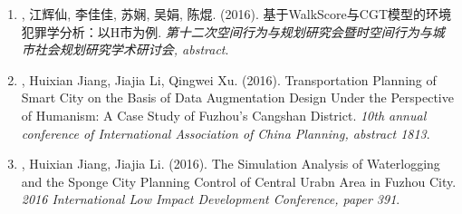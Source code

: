\begin{enumerate}
\item
    {}, 江辉仙, 李佳佳, 苏娴, 吴娟, 陈焜. (2016).
    基于WalkScore与CGT模型的环境犯罪学分析：以H市为例.
    \textit{第十二次空间行为与规划研究会暨时空间行为与城市社会规划研究学术研讨会, abstract}.
\item
     \Shaoqing, Huixian Jiang, Jiajia Li, Qingwei Xu. (2016).
    Transportation Planning of Smart City on the Basis of Data Augmentation Design Under the Perspective of Humanism: A Case Study of Fuzhou's Cangshan District.
    \textit{10th annual conference of International Association of China Planning, abstract 1813}.
\item
    \Shaoqing, Huixian Jiang, Jiajia Li. (2016).
    The Simulation Analysis of Waterlogging and the Sponge City Planning Control of Central Urabn Area in Fuzhou City.
    \textit{2016 International Low Impact Development Conference, paper 391}.
\end{enumerate}